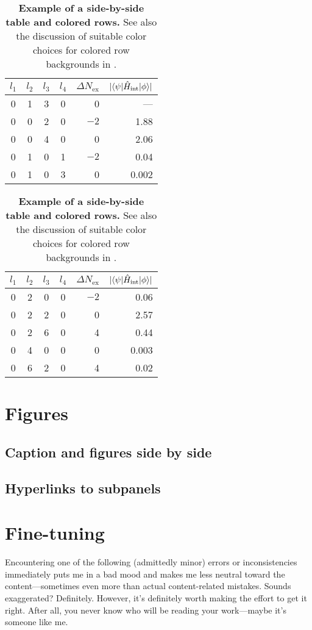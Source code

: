\begin{table}
	\centering 
	\caption{\textbf{Example of a side-by-side table and colored rows.} See also the discussion of suitable color choices for colored row backgrounds in .}
	\label{tab:table3}
	\vspace{5ex}
	\begin{tabular}{ccccrr} 
		\toprule
		$l_1$ & $l_2$ & $l_3$ & $l_4$ & $\Delta N_\text{ex}$ & $|\langle \psi | \hat{H}_\text{int} | \phi \rangle|$  \\ 
		\midrule 
		\rowcolor{pqred} 0 & 1 & 3 & 0 & 0 & ---\\
		0 & 0 & 2 & 0 & $-2$ & 1.88\\
		\rowcolor{pqblue} 0 & 0 & 4 & 0 & 0 & 2.06\\
		0 & 1 & 0 & 1 & $-2$ & 0.04\\
		\rowcolor{pqyellow} 0 & 1 & 0 & 3 & 0 & 0.002\\
		\bottomrule
	\end{tabular}
	\hspace{0.5cm}
	\begin{tabular}{ccccrr} 
		\toprule
		$l_1$ & $l_2$ & $l_3$ & $l_4$ & $\Delta N_\text{ex}$ & $|\langle \psi | \hat{H}_\text{int} | \phi \rangle|$  \\ 
		\midrule 
		0 & 2 & 0 & 0 & $-2$ & 0.06\\
		\rowcolor{pqblue} 0 & 2 & 2 & 0 & 0 & 2.57\\
		0 & 2 & 6 & 0 & 4 & 0.44\\
		\rowcolor{pqyellow} 0 & 4 & 0 & 0 & 0 & 0.003\\
		0 & 6 & 2 & 0 & 4 & 0.02\\
		\bottomrule
	\end{tabular}
\end{table}

\section{Figures}
\subsection{Caption and figures side by side}
\subsection{Hyperlinks to subpanels}

\section{Fine-tuning}
Encountering one of the following (admittedly minor) errors or inconsistencies immediately puts me in a bad mood and makes me less neutral toward the content---sometimes even more than actual content-related mistakes. Sounds exaggerated? Definitely. However, it's definitely worth making the effort to get it right. After all, you never know who will be reading your work---maybe it’s someone like me.
